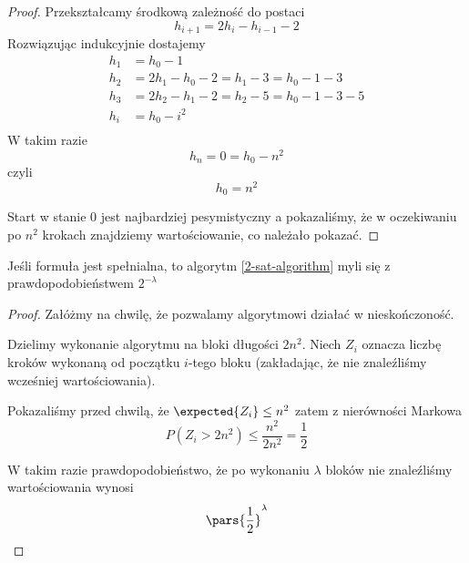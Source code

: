 \begin{proof}
    Przekształcamy środkową zależność do postaci
    \[
        h_{i + 1} = 2h_i - h_{i - 1} - 2
    \]
    Rozwiązując indukcyjnie dostajemy
    \begin{align*}
        h_1 &= h_0 - 1 \\
        h_2 &= 2h_1 - h_0 - 2 = h_1 - 3 = h_0 - 1 - 3 \\
        h_3 &= 2h_2 - h_1 - 2 = h_2 - 5 = h_0 - 1 - 3 - 5 \\
        h_i &= h_0 - i^2 \\
    \end{align*}
    W takim razie
    \[
        h_n = 0 = h_0 - n^2
    \]
    czyli \[ h_0 = n^2 \]
    
    Start w stanie 0 jest najbardziej pesymistyczny a pokazaliśmy, że w oczekiwaniu po \( n^2 \) krokach znajdziemy wartościowanie, co należało pokazać.
\end{proof}

\begin{theorem}[Lemat 7.2 P\&C]
    Jeśli formuła jest spełnialna, to algorytm \ref{2-sat-algorithm} myli się z prawdopodobieństwem \( 2^{-\lambda} \)
\end{theorem}
\begin{proof}
    Załóżmy na chwilę, że pozwalamy algorytmowi działać w nieskończoność.
    
    Dzielimy wykonanie algorytmu na bloki długości \( 2n^2 \).
    Niech \( Z_i \) oznacza liczbę kroków wykonaną od początku \( i \)-tego bloku (zakładając, że nie znaleźliśmy wcześniej wartościowania).
    
    Pokazaliśmy przed chwilą, że \(\expected{Z_i} \leq n^2\) zatem z nierówności Markowa
    \[
        P(Z_i > 2n^2) \leq \frac{n^2}{2n^2} = \frac{1}{2}
    \]
    
    W takim razie prawdopodobieństwo, że po wykonaniu \( \lambda \) bloków nie znaleźliśmy wartościowania wynosi
    \[
        \pars{\frac{1}{2}}^\lambda
    \]
    
\end{proof}